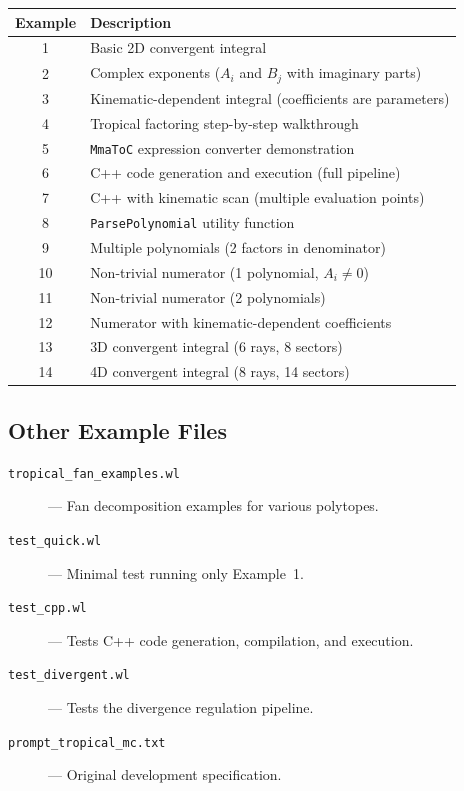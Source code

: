 \documentclass[11pt,a4paper]{article}
\begin{document}
\begin{center}
\begin{tabular}{cl}
\toprule
\textbf{Example} & \textbf{Description} \\
\midrule
1 & Basic 2D convergent integral \\
2 & Complex exponents ($A_i$ and $B_j$ with imaginary parts) \\
3 & Kinematic-dependent integral (coefficients are parameters) \\
4 & Tropical factoring step-by-step walkthrough \\
5 & \texttt{MmaToC} expression converter demonstration \\
6 & C++ code generation and execution (full pipeline) \\
7 & C++ with kinematic scan (multiple evaluation points) \\
8 & \texttt{ParsePolynomial} utility function \\
9 & Multiple polynomials (2 factors in denominator) \\
10 & Non-trivial numerator (1 polynomial, $A_i \neq 0$) \\
11 & Non-trivial numerator (2 polynomials) \\
12 & Numerator with kinematic-dependent coefficients \\
13 & 3D convergent integral (6 rays, 8 sectors) \\
14 & 4D convergent integral (8 rays, 14 sectors) \\
\bottomrule
\end{tabular}
\end{center}

\subsection*{Other Example Files}

\begin{description}
  \item[\texttt{tropical\_fan\_examples.wl}] --- Fan decomposition examples for various polytopes.
  \item[\texttt{test\_quick.wl}] --- Minimal test running only Example~1.
  \item[\texttt{test\_cpp.wl}] --- Tests C++ code generation, compilation, and execution.
  \item[\texttt{test\_divergent.wl}] --- Tests the divergence regulation pipeline.
  \item[\texttt{prompt\_tropical\_mc.txt}] --- Original development specification.
\end{description}
\end{document}
